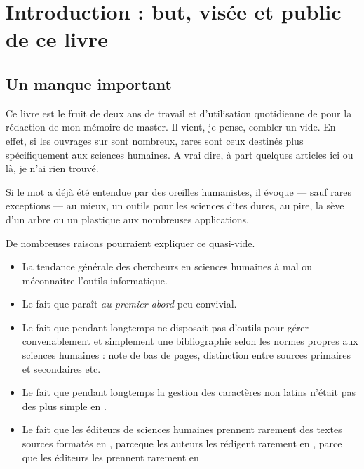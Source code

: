 \chapter{Introduction : but, visée et public de ce livre}
\section{Un manque important}

Ce livre est le fruit de deux ans de travail et d'utilisation quotidienne de \logiciel{\LaTeX} pour la rédaction de mon mémoire de master. Il vient, je pense, combler un vide. En effet, si les ouvrages sur \logiciel{\LaTeX} sont nombreux, rares sont ceux destinés plus spécifiquement aux sciences humaines. A vrai dire, à part quelques articles ici ou là, je n'ai rien trouvé.


Si le mot \logiciel{\LaTeX} a déjà été entendue par des oreilles humanistes, il évoque --- sauf rares exceptions --- au mieux, un outils pour les sciences dites dures, au pire, la sève d'un arbre ou un plastique aux nombreuses applications. 

De nombreuses raisons pourraient expliquer ce quasi-vide.
\begin{itemize}
\item La tendance générale des chercheurs en sciences humaines à mal ou méconnaitre l'outils informatique.
\item Le fait que \logiciel{\LaTeX} paraît \emph{au premier abord} peu convivial.
\item Le fait que pendant longtemps \logiciel{\LaTeX} ne disposait pas d'outils pour gérer convenablement et simplement une bibliographie selon les normes propres aux sciences humaines : note de bas de pages, distinction entre sources primaires et secondaires etc.
\item Le fait que pendant longtemps la gestion des caractères non latins n'était pas des plus simple en \logiciel{\LaTeX}.
\item Le fait que les éditeurs de sciences humaines prennent rarement des textes sources formatés en \logiciel{\LaTeX}, parceque les auteurs les rédigent rarement en \logiciel{\LaTeX}, parce que les éditeurs les prennent rarement en \logiciel{\LaTeX}
\end{itemize}

